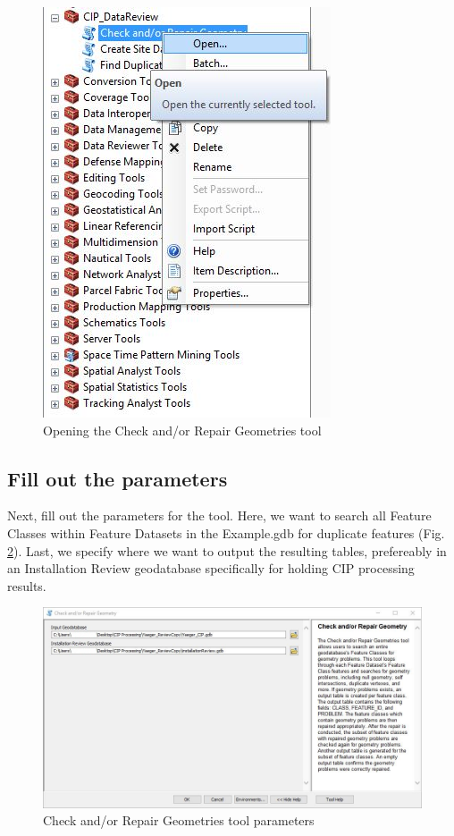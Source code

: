 \documentclass[openany]{book}
\theoremstyle{definition}
\theoremstyle{definition}
\theoremstyle{definition}
\theoremstyle{remark}
\begin{document}
\begin{figure}[H]

{\centering \includegraphics{figures/chkG-open} 

}

\caption{Opening the Check and/or Repair Geometries tool}\label{fig:chkGopen}
\end{figure}

\subsection{Fill out the parameters}\label{fill-out-the-parameters-5}

Next, fill out the parameters for the tool. Here, we want to search all
Feature Classes within Feature Datasets in the Example.gdb for duplicate
features (Fig. \ref{fig:chkGparams}). Last, we specify where we want to
output the resulting tables, prefereably in an Installation Review
geodatabase specifically for holding CIP processing results.\\

\begin{figure}[H]

{\centering \includegraphics{figures/chkG-params} 

}

\caption{Check and/or Repair Geometries tool parameters}\label{fig:chkGparams}
\end{figure}
\end{document}
